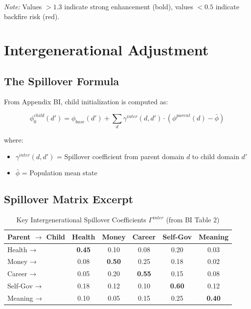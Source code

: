 \textit{Note:} Values $> 1.3$ indicate strong enhancement (bold), values $< 0.5$ indicate backfire risk (red).


\section{Intergenerational Adjustment}
\label{sec:calc-intergenerational}

\subsection{The Spillover Formula}

From Appendix BI, child initialization is computed as:

\begin{equation}
\boxed{
\phi_0^{child}(d') = \phi_{base}(d') + \sum_d \gamma^{inter}(d, d') \cdot (\phi^{parent}(d) - \bar{\phi})
}
\label{eq:spillover}
\end{equation}

where:
\begin{itemize}
\item $\gamma^{inter}(d, d')$ = Spillover coefficient from parent domain $d$ to child domain $d'$
\item $\bar{\phi}$ = Population mean state
\end{itemize}

\subsection{Spillover Matrix Excerpt}

\begin{table}[htbp]
\centering
\caption{Key Intergenerational Spillover Coefficients $\Gamma^{inter}$ (from BI Table 2)}
\label{tab:spillover-excerpt}
\renewcommand{\arraystretch}{1.2}
\begin{tabular}{@{}l|ccccc@{}}
\toprule
\textbf{Parent $\rightarrow$ Child} & Health & Money & Career & Self-Gov & Meaning \\
\midrule
Health → & \textbf{0.45} & 0.10 & 0.08 & 0.20 & 0.03 \\
Money → & 0.08 & \textbf{0.50} & 0.25 & 0.18 & 0.02 \\
Career → & 0.05 & 0.20 & \textbf{0.55} & 0.15 & 0.08 \\
Self-Gov → & 0.18 & 0.12 & 0.10 & \textbf{0.60} & 0.12 \\
Meaning → & 0.10 & 0.05 & 0.15 & 0.25 & \textbf{0.40} \\
\bottomrule
\end{tabular}
\end{table}

